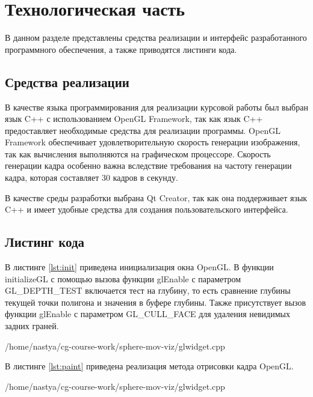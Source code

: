 \chapter{Технологическая часть}

В данном разделе представлены средства реализации и интерфейс разработанного программного обеспечения, а также приводятся листинги кода.

\section{Средства реализации}

В качестве языка программирования для реализации курсовой работы был выбран язык C++ с использованием OpenGL Framework, так как язык C++ предоставляет необходимые средства для реализации программы. OpenGL Framework обеспечивает удовлетворительную скорость генерации изображения, так как вычисления выполняются на графическом процессоре. Скорость генерации кадра особенно важна вследствие требования на частоту генерации кадра, которая составляет 30 кадров в секунду.

В качестве среды разработки выбрана Qt Creator, так как она поддерживает язык C++ и имеет удобные средства для создания пользовательского интерфейса.

\section{Листинг кода}

В листинге \ref{lst:init} приведена инициализация окна OpenGL. В функции initializeGL с помощью вызова функции glEnable с параметром GL\_DEPTH\_TEST включается тест на глубину, то есть сравнение глубины текущей точки полигона и значения в буфере глубины. Также присутствует вызов функции glEnable с параметром GL\_CULL\_FACE для удаления невидимых задних граней.

\pagebreak

\begin{lstinputlisting}[
	caption={Инициализация opengl-окна},
	label={lst:init},
	style={cpp},
	linerange={99-115},
	]{/home/nastya/cg-course-work/sphere-mov-viz/glwidget.cpp}
\end{lstinputlisting}

В листинге \ref{lst:paint} приведена реализация метода отрисовки кадра OpenGL.

\begin{lstinputlisting}[
	caption={Отрисовка кадра},
	label={lst:paint},
	style={cpp},
	linerange={177-199},
	]{/home/nastya/cg-course-work/sphere-mov-viz/glwidget.cpp}
\end{lstinputlisting}


